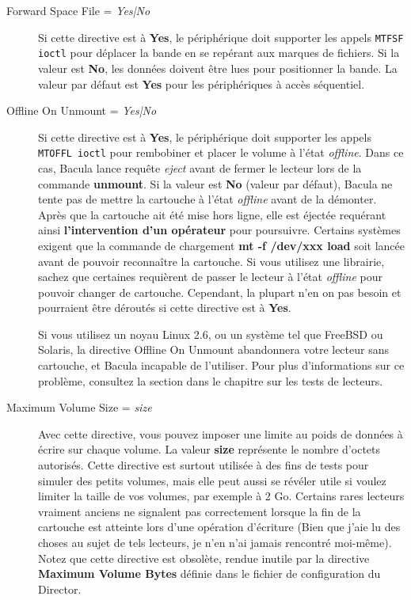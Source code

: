 \begin{description}
\item [Forward Space File = {\it Yes|No}]
   Si cette directive est \`a {\bf Yes}, le p\'eriph\'erique doit supporter les appels
   {\tt MTFSF  ioctl} pour d\'eplacer la bande en se rep\'erant aux marques de fichiers. 
   Si la valeur est {\bf No}, les donn\'ees doivent \^etre lues pour positionner la 
   bande.  La valeur par d\'efaut est 
   {\bf Yes} pour les p\'eriph\'eriques \`a acc\`es s\'equentiel.

\item [Offline On Unmount = {\it Yes|No}]
   Si cette directive est \`a {\bf Yes}, le p\'eriph\'erique doit supporter les appels 
   {\tt MTOFFL ioctl} pour rembobiner et placer le volume \`a l'\'etat {\it offline}. 
   Dans ce cas, Bacula lance requ\^ete {\it eject} avant de fermer le lecteur lors 
   de la commande {\bf unmount}. Si la valeur est {\bf No} (valeur par d\'efaut), 
   Bacula ne tente pas de mettre la cartouche \`a l'\'etat {\it offline} avant de 
   la d\'emonter. Apr\`es que la cartouche ait \'et\'e mise hors ligne, elle est \'eject\'ee 
   requ\'erant ainsi {\bf l'intervention d'un op\'erateur} pour poursuivre. Certains 
   syst\`emes exigent que la commande de chargement {\bf mt -f /dev/xxx load} 
   soit lanc\'ee avant de pouvoir reconna\^itre la cartouche. Si vous utilisez une 
   librairie, sachez que certaines requi\`erent de passer le lecteur \`a l'\'etat 
   {\it offline} pour pouvoir changer de cartouche. Cependant, la plupart n'en 
   on pas besoin et pourraient \^etre d\'erout\'es si cette directive est \`a {\bf Yes}.
   
   Si vous utilisez un noyau Linux 2.6, ou un syst\`eme tel que FreeBSD ou Solaris, 
   la directive Offline On Unmount abandonnera votre lecteur sans cartouche, et Bacula 
   incapable de l'utiliser. Pour plus d'informations sur ce probl\`eme, 
   consultez la section  dans le 
   chapitre sur les tests de lecteurs.
   
\item [Maximum Volume Size = {\it size}]
   Avec cette directive, vous pouvez imposer une limite au poids de donn\'ees 
   \`a \'ecrire sur chaque volume. La valeur {\bf size} repr\'esente le nombre d'octets 
   autoris\'es. Cette directive est surtout utilis\'ee \`a des fins de tests pour 
   simuler des petits volumes, mais elle peut aussi se r\'ev\'eler utile si voulez 
   limiter la taille de vos volumes, par exemple \`a 2 Go. Certains rares lecteurs 
   vraiment anciens ne signalent pas correctement lorsque la fin de la 
   cartouche est atteinte lors d'une op\'eration d'\'ecriture (Bien que j'aie lu des 
   choses au sujet de tels lecteurs, je n'en n'ai jamais rencontr\'e moi-m\^eme). Notez 
   que cette directive est obsol\`ete, rendue inutile par la 
   directive {\bf Maximum Volume Bytes} d\'efinie dans le fichier de configuration 
   du Director.


\end{description}

